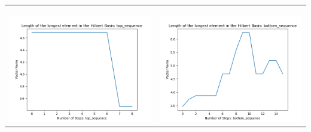 \documentclass[10pt]{article}
\begin{document}
\begin{tabular}{c|c}
\begin{minipage}{.45\textwidth}
\end{minipage} \\ \\
\hline \\\begin{minipage}{.45\textwidth}
\includegraphics[width=\textwidth]{"DATA/4d/4 generators 2 bound D/top_sequence LENGTH"}
\end{minipage} &
\begin{minipage}{.45\textwidth}
\includegraphics[width=\textwidth]{"DATA/4d/4 generators 2 bound D bottomup/bottom_sequence LENGTH"}
\end{minipage}
\end{tabular}
\end{document}
